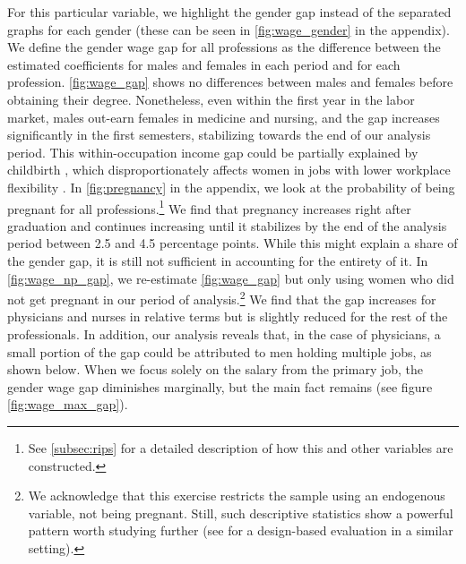 \documentclass[12pt, a4paper]{article}
\begin{document}
For this particular variable, we highlight the gender gap instead of the separated graphs for each gender (these can be seen in \autoref{fig:wage_gender} in the appendix). We define the gender wage gap for all professions as the difference between the estimated coefficients for males and females in each period and for each profession. \autoref{fig:wage_gap} shows no differences between males and females before obtaining their degree. Nonetheless, even within the first year in the labor market, males out-earn females in medicine and nursing, and the gap increases significantly in the first semesters, stabilizing towards the end of our analysis period. This within-occupation income gap could be partially explained by childbirth \citep{bertrand2010dynamics}, which disproportionately affects women in jobs with lower workplace flexibility \citep{goldin2011cost,goldin2014grand}. In \autoref{fig:pregnancy} in the appendix, we look at the probability of being pregnant for all professions.\footnote{See \autoref{subsec:rips} for a detailed description of how this and other variables are constructed.} We find that pregnancy increases right after graduation and continues increasing until it stabilizes by the end of the analysis period between 2.5 and 4.5 percentage points. While this might explain a share of the gender gap, it is still not sufficient in accounting for the entirety of it. In \autoref{fig:wage_np_gap}, we re-estimate \autoref{fig:wage_gap} but only using women who did not get pregnant in our period of analysis.\footnote{We acknowledge that this exercise restricts the sample using an endogenous variable, not being pregnant. Still, such descriptive statistics show a powerful pattern worth studying further (see \cite{Posso2024gender} for a design-based evaluation in a similar setting).} We find that the gap increases for physicians and nurses in relative terms but is slightly reduced for the rest of the professionals. In addition, our analysis reveals that, in the case of physicians, a small portion of the gap could be attributed to men holding multiple jobs, as shown below. When we focus solely on the salary from the primary job, the gender wage gap diminishes marginally, but the main fact remains (see figure \autoref{fig:wage_max_gap}). 
\end{document}
